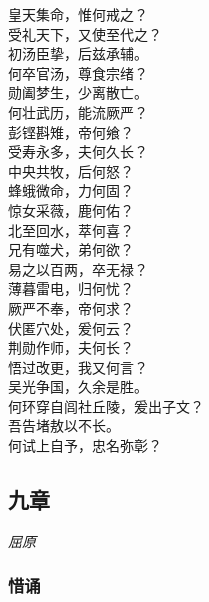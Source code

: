 \documentclass[]{article}
\begin{document}
皇天集命，惟何戒之？\\
受礼天下，又使至代之？\\
初汤臣挚，后兹承辅。\\
何卒官汤，尊食宗绪？\\
勋阖梦生，少离散亡。\\
何壮武历，能流厥严？\\
彭铿斟雉，帝何飨？\\
受寿永多，夫何久长？\\
中央共牧，后何怒？\\
蜂蛾微命，力何固？\\
惊女采薇，鹿何佑？\\
北至回水，萃何喜？\\
兄有噬犬，弟何欲？\\
易之以百两，卒无禄？\\
薄暮雷电，归何忧？\\
厥严不奉，帝何求？\\
伏匿穴处，爰何云？\\
荆勋作师，夫何长？\\
悟过改更，我又何言？\\
吴光争国，久余是胜。\\
何环穿自闾社丘陵，爰出子文？\\
吾告堵敖以不长。\\
何试上自予，忠名弥彰？

\hypertarget{header-n2836}{%
\subsection{九章}\label{header-n2836}}

\emph{屈原}

\hypertarget{header-n2841}{%
\subsubsection{惜诵}\label{header-n2841}}
\end{document}
